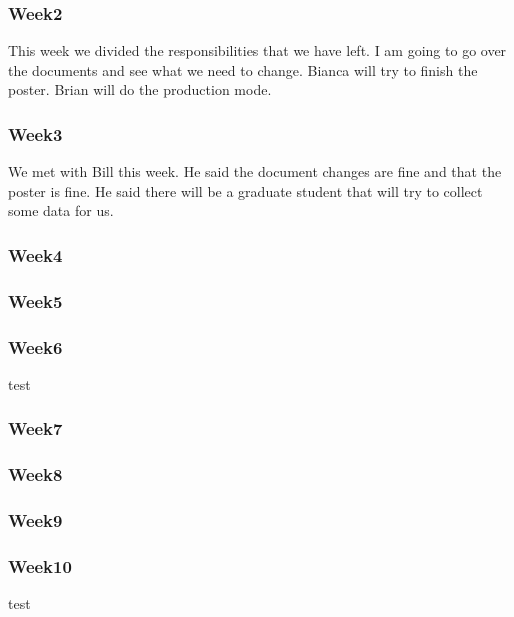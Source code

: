 \subsubsection*{Week2}
	This week we divided the responsibilities that we have left. I am going to go over the documents and see what we need to change. Bianca will try to finish the poster. Brian will do the production mode.
\subsubsection*{Week3}
	We met with Bill this week. He said the document changes are fine and that the poster is fine. He said there will be a graduate student that will try to collect some data for us. 
\subsubsection*{Week4}
	
\subsubsection*{Week5}
\subsubsection*{Week6}
test
\subsubsection*{Week7}
\subsubsection*{Week8}
\subsubsection*{Week9}
\subsubsection*{Week10}
test